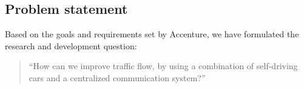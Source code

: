 \subsection{Problem statement}\label{sec:problem_statement}
Based on the goals and requirements set by Accenture, we have formulated the research and development question:
\begin{quote}
	``How can we improve traffic flow, by using a combination of self-driving cars and a centralized communication system?''
\end{quote}